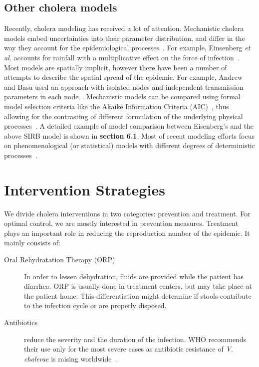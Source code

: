 \subsection{Other cholera models}

Recently, cholera modeling has received a lot of attention. Mechanistic cholera models embed uncertainties into their parameter distribution, and differ in the way they account for the epidemiological processes~\cite{kirpich_controlling_2017, tuite_cholera_2011, chao_vaccination_2011, kirpich_cholera_2015}. For example, Einsenberg \textit{et al.} accounts for rainfall with a multiplicative effect on the force of infection~\cite{eisenberg_examining_2013, eisenberg_identifiability_2013, eisenberg_cholera_2013}. Most models are spatially implicit, however there have been a number of attempts to describe the spatial spread of the epidemic. For example, Andrew and Basu used an approach with isolated nodes and independent transmission parameters in each node~\cite{andrews_transmission_2011}.  Mechanistic models can be compared using formal model selection criteria like the Akaike Information Criteria (AIC)~\cite{akaike_new_1974}, thus allowing for the contrasting of different formulation of the underlying physical processes~\cite{baracchini_seasonality_2017, king_inapparent_2008,akman_examination_2016, rinaldo_reassessment_2012}. A detailed example of model comparison between Eisenberg's and the above SIRB model is shown in \textbf{section 6.1}. Most of recent modeling efforts focus on phenomenological (or statistical) models with different degrees of deterministic processes~\cite{azman_urban_2012, finger_potential_2018, camacho_cholera_2018, lessler_mapping_2018, koelle_disentangling_2004}.



\section{Intervention Strategies} 
We divide cholera interventions in two categories: prevention and treatment. For optimal control, we are mostly interested in prevention measures. Treatment plays an important role in reducing the reproduction number of the epidemic. It mainly consists of:
\begin{description}
\item[Oral Rehydratation Therapy (ORP)] In order to lessen dehydration, fluids are provided while the patient has diarrhea. ORP is usually done in treatment centers, but may take place at the patient home. This differentiation might determine if stools contribute to the infection cycle or are properly disposed.
\item[Antibiotics] reduce the severity and the duration of the infection. WHO recommends their use only for the most severe cases as antibiotic resistance of \emph{V. cholerae} is raising worldwide~\cite{sack_getting_2006}.
\end{description}

